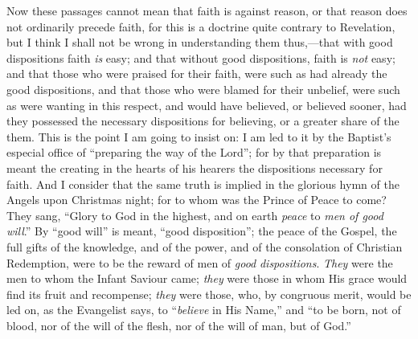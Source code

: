 Now these passages cannot mean that faith is against
reason, or that reason does not ordinarily precede faith,
for this is a doctrine quite contrary to Revelation, but
I think I shall not be wrong in understanding them
thus,—that with good dispositions faith \emph{is}
easy; and that without good dispositions, faith is \emph{not}
easy; and that those who were praised for their faith,
were such as had already the good dispositions, and that
those who were blamed for their unbelief, were such as
were wanting in this respect, and would have believed, or
believed sooner, had they possessed the necessary
dispositions for believing, or a greater share of the
them. This is the point I am going to insist on: I am led
to it by the Baptist's especial office of ``preparing
the way of the Lord''; for by that preparation is
meant the creating in the hearts of his hearers the
dispositions necessary for faith. And I consider that the
same truth is implied in the glorious hymn of the Angels
upon Christmas night; for to whom was the Prince of Peace
to come? They sang, ``Glory to God in the highest,
and on earth \emph{peace} to \emph{men of good will}.''
By ``good will'' is meant, ``good
disposition''; the peace of the Gospel, the full
gifts of the knowledge, and of the power, and of the
consolation of Christian Redemption, were to be the
reward of men of \emph{good} \emph{dispositions}. \emph{They}
were the men to whom the Infant Saviour came; \emph{they}
were those in whom His grace would find its fruit and
recompense; \emph{they} were those, who, by congruous
merit, would be led on, as the Evangelist says, to ``\emph{believe}
in His Name,'' and ``to be born, not of blood,
nor of the will of the flesh, nor of the will of man, but
of God.''

